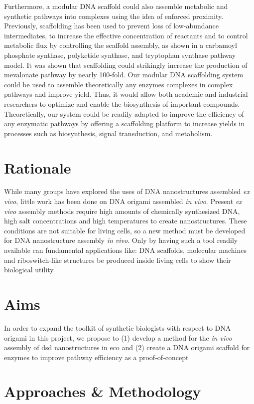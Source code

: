 \documentclass[a4paper]{article}
\begin{document}
Furthermore, a modular DNA scaffold could also assemble metabolic and synthetic pathways into complexes using the idea of enforced proximity.
Previously, scaffolding has been used to prevent loss of low-abundance intermediates, to increase the effective concentration of reactants and to control metabolic flux by controlling the scaffold assembly, as shown in a carbamoyl phosphate synthase, polyketide synthase, and tryptophan synthase pathway model\cite{intro13,intro14,intro15}.
It was shown that scaffolding could strikingly increase the production of mevalonate pathway by nearly 100-fold\cite{intro16}.
Our modular DNA scaffolding system could be used to assemble theoretically any enzymes complexes in complex pathways and improve yield.
Thus, it would allow both academic and industrial researchers to optimize and enable the biosynthesis of important compounds.
Theoretically, our system could be readily adapted to improve the efficiency of any enzymatic pathways by offering a scaffolding platform to increase yields in processes such as biosynthesis, signal transduction, and metabolism\cite{tab7}.
\section*{Rationale}
While many groups have explored the uses of DNA nanostructures assembled \textit{ex vivo}, little work has been done on DNA origami assembled \textit{in vivo}.
Present \textit{ex vivo} assembly methods require high amounts of chemically synthesized DNA, high salt concentrations and high temperatures to create nanostructures.
These conditions are not suitable for living cells, so a new method must be developed for DNA nanostructure assembly \textit{in vivo}.
Only by having such a tool readily available can fundamental applications like: DNA scaffolds,  molecular machines and riboswitch-like structures be produced inside living cells to show their biological utility.
\section*{Aims}
In order to expand the toolkit of synthetic biologists with respect to DNA origami in this project, we propose to (1) develop a method for the \textit{in vivo} assembly of \ac{dsd} nanostructures in \ac{eco} and (2) create a DNA origami scaffold for enzymes to improve pathway efficiency as a proof-of-concept
\section*{Approaches \& Methodology}
\end{document}
